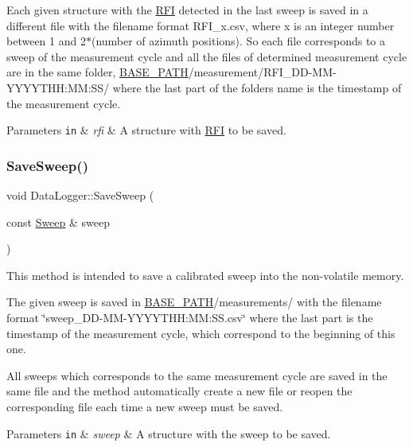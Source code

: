 Each given structure with the \hyperlink{structRFI}{R\+FI} detected in the last sweep is saved in a different file with the filename format R\+F\+I\+\_\+x.\+csv, where \textquotesingle{}x\textquotesingle{} is an integer number between 1 and 2$\ast$(number of azimuth positions). So each file corresponds to a sweep of the measurement cycle and all the files of determined measurement cycle are in the same folder, \hyperlink{Basics_8h_a0423f4cb393331ce0b9f6b3a43adcaae}{B\+A\+S\+E\+\_\+\+P\+A\+TH}/measurement/\+R\+F\+I\+\_\+\+D\+D-\/\+M\+M-\/\+Y\+Y\+Y\+Y\+T\+HH\+:MM\+:S\+S/ where the last part of the folder\textquotesingle{}s name is the timestamp of the measurement cycle. 
\begin{DoxyParams}[1]{Parameters}
\mbox{\tt in}  & {\em rfi} & A structure with \hyperlink{structRFI}{R\+FI} to be saved. \\
\hline
\end{DoxyParams}
\mbox{\label{classDataLogger_ab2063fcd87971520a5bfa5aef6d73fea}} 
\subsubsection{\texorpdfstring{Save\+Sweep()}{SaveSweep()}}
{\footnotesize\ttfamily void Data\+Logger\+::\+Save\+Sweep (\begin{DoxyParamCaption}\item[{const \hyperlink{structSweep}{Sweep} \&}]{sweep }\end{DoxyParamCaption})}



This method is intended to save a calibrated sweep into the non-\/volatile memory. 

The given sweep is saved in \hyperlink{Basics_8h_a0423f4cb393331ce0b9f6b3a43adcaae}{B\+A\+S\+E\+\_\+\+P\+A\+TH}/measurements/ with the filename format \char`\"{}sweep\+\_\+\+D\+D-\/\+M\+M-\/\+Y\+Y\+Y\+Y\+T\+H\+H\+:\+M\+M\+:\+S\+S.\+csv\char`\"{} where the last part is the timestamp of the measurement cycle, which correspond to the beginning of this one.

All sweeps which corresponds to the same measurement cycle are saved in the same file and the method automatically create a new file or reopen the corresponding file each time a new sweep must be saved. 
\begin{DoxyParams}[1]{Parameters}
\mbox{\tt in}  & {\em sweep} & A structure with the sweep to be saved. \\
\hline
\end{DoxyParams}
\mbox{\label{classDataLogger_ab58f4cc05f738ef757c884fe9ef131eb}} 
